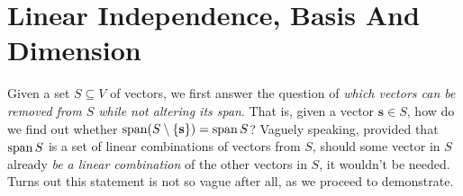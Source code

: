 \section{Linear Independence, Basis And Dimension}
\label{sec:linear-independence-basis-and-dimension}

Given a set $S \subseteq V$ of vectors, we first answer the question of
\emph{which vectors can be removed from $S$ while not altering its span}. That
is, given a vector $\mathbf{s} \in S$, how do we find out whether $\operatorname{span} (S
\setminus \{\mathbf{s}\}) = \operatorname{span} S$? Vaguely speaking, provided that $\operatorname{span} S$ is
a set of linear combinations of vectors from $S$, should some vector in $S$
already \emph{be a linear combination} of the other vectors in $S$, it wouldn't
be needed. Turns out this statement is not so vague after all, as we proceed to
demonstrate.

